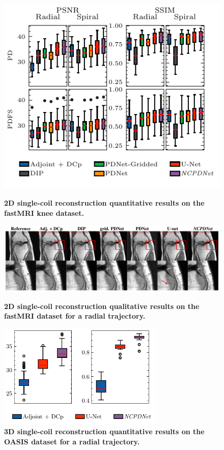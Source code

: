 \begin{frame}
    \begin{figure}
        \begin{overprint}
            \centering\includegraphics[height=0.9\textheight]{Figures/dl_mri_figures/single_coil.pdf}\caption{\textbf{2D single-coil reconstruction quantitative results on the fastMRI knee dataset.}}
            \centering\includegraphics[width=\textwidth]{Figures/dl_mri_figures/quali_no_err_af4_radial.pdf}\caption{\textbf{2D single-coil reconstruction qualitative results on the fastMRI dataset for a radial trajectory.}}
            \centering\includegraphics[width=0.7\textwidth]{Figures/dl_mri_figures/3d.pdf}\caption{\textbf{3D single-coil reconstruction quantitative results on the OASIS dataset for a radial trajectory.}}

\end{overprint}
\end{figure}
\end{frame}
